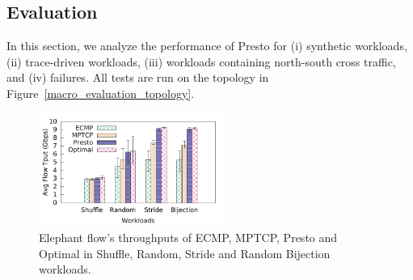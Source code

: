 \subsection{Evaluation}
\label{sec:presto-eval}

In this section, we analyze the performance of Presto for (i) synthetic workloads, (ii)
trace-driven workloads, (iii) workloads containing north-south cross traffic, and (iv) failures.
All tests are run on the topology in Figure~\ref{macro_evaluation_topology}.
\begin{figure}[!t]
        \centering
  \includegraphics[width=0.55\textwidth]{./figures/presto/macro/stride/macro_compare_tput_witherrbar.pdf}
        \caption{Elephant flow's throughputs of ECMP, MPTCP, Presto and Optimal in Shuffle, Random, Stride and Random Bijection workloads.}
        \label{macro_evaluation_tput}
\end{figure}




